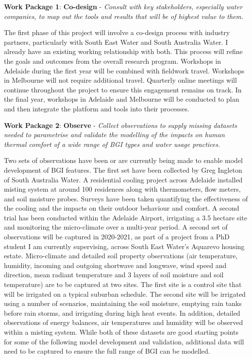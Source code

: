 \textbf{Work Package 1}: \textbf{Co-design} - \emph{Consult with key stakeholders, especially water companies, to map out the tools and results that will be of highest value to them. }

The first phase of this project will involve a co-design process with industry partners, particularly with South East Water and South Australia Water. I already have an existing working relationship with both. This process will refine the goals and outcomes from the overall research program. Workshops in Adelaide during the first year will be combined with fieldwork travel. Workshops in Melbourne will not require additional travel. Quarterly online meetings will continue throughout the project to ensure this engagement remains on track. In the final year, workshops in Adelaide and Melbourne will be conducted to plan and then integrate the platform and tools into their processes.

\textbf{Work Package 2}: \textbf{Observe} - \emph{Collect observations to supply missing datasets needed to parametrise and validate the modelling of the impacts on human thermal comfort of a wide range of BGI types and water usage practices.}


Two sets of observations have been or are currently being made to enable model development of BGI features. The first set have been collected by Greg Ingleton of South Australia Water. A residential cooling project across Adelaide installed misting system at around 100 residences along with thermometers, flow meters, and soil moisture probes. Surveys have been taken quantifying the effectiveness of the cooling and the impacts on their outdoor behaviour and comfort. A second trial has been conducted within the Adelaide Airport, irrigating a 3.5 hectare site and monitoring the micro-climate over a multi-year period. A second set of observations will be captured in 2020-2021, as part of a project from a PhD student I am currently supervising, across South East Water's Aquarevo housing estate. Micro-climate and detailed soil property observations (air temperature, humidity, incoming and outgoing shortwave and longwave, wind speed and direction, mean radiant temperature and 3 layers of soil moisture and soil temperature) are  to be captured at two sites. The first site is a control site that will be irrigated on a typical suburban schedule. The second site will be irrigated using a number of scenarios, maintaining the soil moisture, emptying rain tanks before rain storms, and irrigating during high heat events. In addition, detailed observations of energy balances, air temperatures and humidity will be observed within a misting system. While both of these datasets are good starting points for some of the following model development and validation, additional data will need to be captured to ensure the full range of BGI can be modelled.

